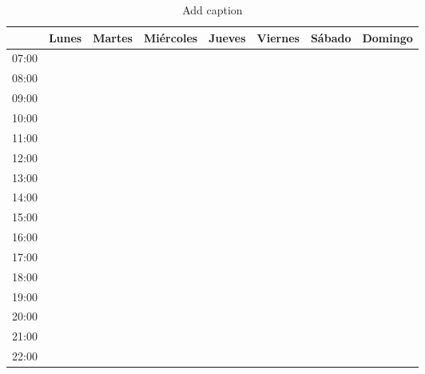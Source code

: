 \documentclass[10pt,a4paper]{article}
\begin{document}
\begin{table}[htbp]
  \centering
    \begin{tabular}{rrrrrrrr}
          & \multicolumn{1}{l}{\textbf{Lunes}} & \multicolumn{1}{l}{\textbf{Martes}} & \multicolumn{1}{l}{\textbf{Miércoles}} & \multicolumn{1}{l}{\textbf{Jueves}} & \multicolumn{1}{l}{\textbf{Viernes}} & \multicolumn{1}{l}{\textbf{Sábado}} & \multicolumn{1}{l}{\textbf{Domingo}} \\
    \hline
    07:00 &       &       &       &       &       &       &  \\
    08:00 &       &       &       &       &       &       &  \\
    09:00 &       &       &       &       &       &       &  \\
    10:00 &       &       &       &       &       &       &  \\
    11:00 &       &       &       &       &       &       &  \\
    12:00 &       &       &       &       &       &       &  \\
    13:00 &       &       &       &       &       &       &  \\
    14:00 &       &       &       &       &       &       &  \\
    15:00 &       &       &       &       &       &       &  \\
    16:00 &       &       &       &       &       &       &  \\
    17:00 &       &       &       &       &       &       &  \\
    18:00 &       &       &       &       &       &       &  \\
    19:00 &       &       &       &       &       &       &  \\
    20:00 &       &       &       &       &       &       &  \\
    21:00 &       &       &       &       &       &       &  \\
    22:00 &       &       &       &       &       &       &  \\
    \end{tabular}%
  \label{tab:addlabel}%
  \caption{Add caption}
\end{table}%




	
\end{document}
